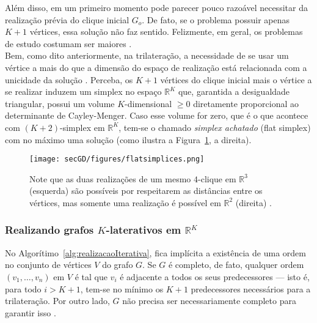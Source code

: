 Além disso, em um primeiro momento pode parecer pouco razoável necessitar da realização prévia do clique inicial $G_o$. De fato, se o problema possuir apenas $K+1$ vértices, essa solução não faz sentido. Felizmente, em geral, os problemas de estudo costumam ser maiores \cite{carlileGDandAplications}. 
\\

Bem, como dito anteriormente, na trilateração, a necessidade de se usar um vértice a mais do que a dimensão do espaço de realização está relacionada com a unicidade da solução \cite{hendrickson1992conditions, connelly1991generic}. Perceba, os $K+1$ vértices do clique inicial mais o vértice a se realizar induzem um simplex no espaço $\mathbb{R}^K$ que, garantida a desigualdade triangular, possui um volume $K$-dimensional $\geq 0$ diretamente proporcional ao determinante de Cayley-Menger. Caso esse volume for zero, que é o que acontece com $(K+2)$-simplex em $\mathbb{R}^K$, tem-se o chamado \textit{simplex achatado} (flat simplex) com no máximo uma solução \cite{libertiEDG} (como ilustra a Figura~\ref{fig:flatsimplices}, a direita).

\begin{figure}[H]
	\begin{center}
		\texttt{[image: secGD/figures/flatsimplices.png]}
	\end{center}
	\caption{Note que as duas realizações de um mesmo $4$-clique em $\mathbb{R}^3$ (esquerda) são possíveis por respeitarem as distâncias entre os vértices, mas somente uma realização é possível em $\mathbb{R}^{2}$ (direita) \cite{libertiEDG}.}
	\label{fig:flatsimplices}
\end{figure}

\subsubsection{Realizando grafos $K$-laterativos em $\mathbb{R}^K$}

No Algorítimo~\ref{alg:realizacaoIterativa}, fica implícita a existência de uma ordem no conjunto de vértices $V$ do grafo $G$. Se $G$ é completo, de fato, qualquer ordem $(v_1,\dots,v_n)$ em $V$ é tal que $v_i$ é adjacente a todos os seus predecessores --- isto é, para todo $i>K+1$, tem-se no mínimo os $K+1$ predecessores necessários para a trilateração. Por outro lado, $G$ não precisa ser necessariamente completo para garantir isso \cite{libertiEDG}.

